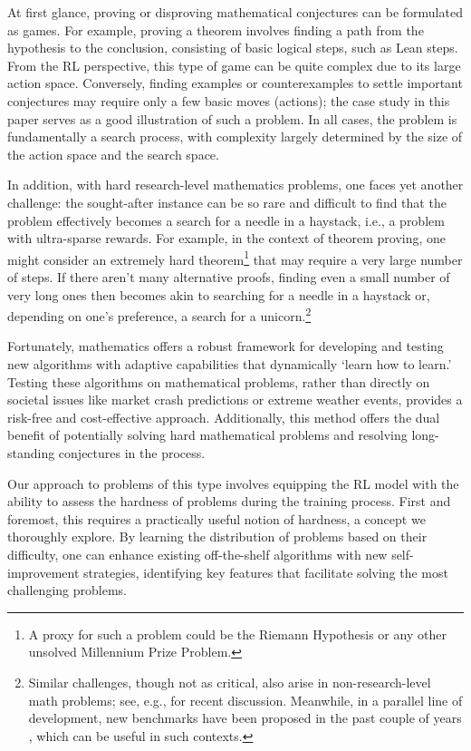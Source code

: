 At first glance, proving or disproving mathematical conjectures can be formulated as games. For example, proving a theorem involves finding a path from the hypothesis to the conclusion, consisting of basic logical steps, such as Lean steps. From the RL perspective, this type of game can be quite complex due to its large action space. Conversely, finding examples or counterexamples to settle important conjectures may require only a few basic moves (actions); the case study in this paper serves as a good illustration of such a problem. In all cases, the problem is fundamentally a search process, with complexity largely determined by the size of the action space and the search space.

In addition, with hard research-level mathematics problems, one faces yet another challenge: the sought-after instance can be so rare and difficult to find that the problem effectively becomes a search for a needle in a haystack, i.e., a problem with ultra-sparse rewards. For example, in the context of theorem proving, one might consider an extremely hard theorem\footnote{A proxy for such a problem could be the Riemann Hypothesis or any other unsolved Millennium Prize Problem.} that may require a very large number of steps. If there aren't many alternative proofs, finding even a small number of very long ones then becomes akin to searching for a needle in a haystack or, depending on one's preference, a search for a unicorn.\footnote{Similar challenges, though not as critical, also arise in non-research-level math problems; see, e.g., \cite{peano,dabelow2024symbolicequationsolvingreinforcement,trinh2024solving} for recent discussion. Meanwhile, in a parallel line of development, new benchmarks have been proposed in the past couple of years \cite{procgen,NeedleInAHaystack}, which can be useful in such contexts.}

Fortunately, mathematics offers a robust framework for developing and testing new algorithms with adaptive capabilities that dynamically `learn how to learn.' Testing these algorithms on mathematical problems, rather than directly on societal issues like market crash predictions or extreme weather events, provides a risk-free and cost-effective approach. Additionally, this method offers the dual benefit of potentially solving hard mathematical problems and resolving long-standing conjectures in the process.

Our approach to problems of this type involves equipping the RL model with the ability to assess the hardness of problems during the training process. First and foremost, this requires a practically useful notion of hardness, a concept we thoroughly explore. By learning the distribution of problems based on their difficulty, one can enhance existing off-the-shelf algorithms with new self-improvement strategies, identifying key features that facilitate solving the most challenging problems.

